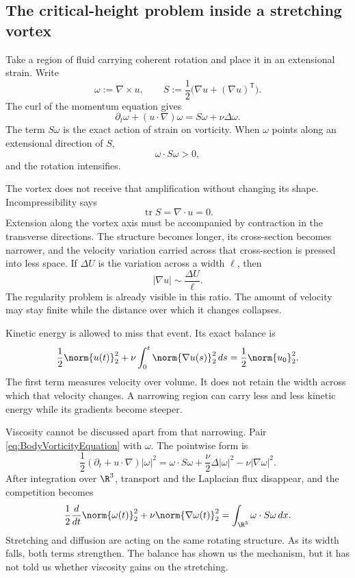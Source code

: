 \subsection{The critical-height problem inside a stretching vortex}\label{sub:ThePerfectlyStretchingVortex}

Take a region of fluid carrying coherent rotation and place it in an
extensional strain.  Write
\[
  \omega:=\nabla\times u,
  \qquad
  S:=\frac12\bigl(\nabla u+(\nabla u)^{\mathsf T}\bigr).
\]
The curl of the momentum equation gives
\begin{equation}\label{eq:BodyVorticityEquation}
  \partial_t\omega+(u\cdot\nabla)\omega
  =S\omega+\nu\Delta\omega.
\end{equation}
The term \(S\omega\) is the exact action of strain on vorticity.  When
\(\omega\) points along an extensional direction of \(S\),
\[
  \omega\cdot S\omega>0,
\]
and the rotation intensifies.

The vortex does not receive that amplification without changing its shape.
Incompressibility says
\[
  \operatorname{tr}S=\nabla\cdot u=0.
\]
Extension along the vortex axis must be accompanied by contraction in the
transverse directions.  The structure becomes longer, its cross-section
becomes narrower, and the velocity variation carried across that
cross-section is pressed into less space.  If \(\Delta U\) is the variation
across a width \(\ell\), then
\[
  |\nabla u|\sim\frac{\Delta U}{\ell}.
\]
The regularity problem is already visible in this ratio.  The amount of
velocity may stay finite while the distance over which it changes collapses.

Kinetic energy is allowed to miss that event.  Its exact balance is
\begin{equation}\label{eq:BodyEnergyIdentity}
  \frac12\norm{u(t)}_2^2
  +\nu\int_0^t\norm{\nabla u(s)}_2^2\,ds
  =\frac12\norm{u_0}_2^2.
\end{equation}
The first term measures velocity over volume.  It does not retain the width
across which that velocity changes.  A narrowing region can carry less and
less kinetic energy while its gradients become steeper.

Viscosity cannot be discussed apart from that narrowing.  Pair
\eqref{eq:BodyVorticityEquation} with \(\omega\).  The pointwise form is
\[
  \frac12(\partial_t+u\cdot\nabla)|\omega|^2
  =\omega\cdot S\omega
  +\frac\nu2\Delta|\omega|^2
  -\nu|\nabla\omega|^2.
\]
After integration over \(\R^3\), transport and the Laplacian flux disappear,
and the competition becomes
\begin{equation}\label{eq:BodyEnstrophyBalance}
  \frac12\frac d{dt}\norm{\omega(t)}_2^2
  +\nu\norm{\nabla\omega(t)}_2^2
  =\int_{\R^3}\omega\cdot S\omega\,dx.
\end{equation}
Stretching and diffusion are acting on the same rotating structure.  As its
width falls, both terms strengthen.  The balance has shown us the mechanism,
but it has not told us whether viscosity gains on the stretching.

